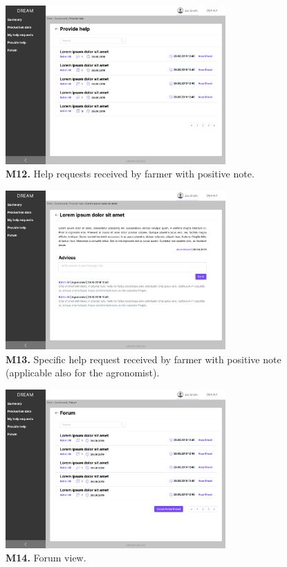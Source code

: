 \begin{figure}[H]
    \centering
    \includegraphics[width=0.75\textwidth]{mockups/Farmer_Dashboard_Provide help.png}
    \caption{\textbf{M12.} Help requests received by farmer with positive note.}
\end{figure}

\begin{figure}[H]
    \centering
    \includegraphics[width=0.75\textwidth]{mockups/Farmer_Dashboard_Provide help_Request.png}
    \caption{\textbf{M13.} Specific help request received by farmer with positive note (applicable also for the agronomist).}
\end{figure}

\begin{figure}[H]
    \centering
    \includegraphics[width=0.75\textwidth]{mockups/Farmer_Dashboard_Forum.png}
    \caption{\textbf{M14.} Forum view.}
\end{figure}

